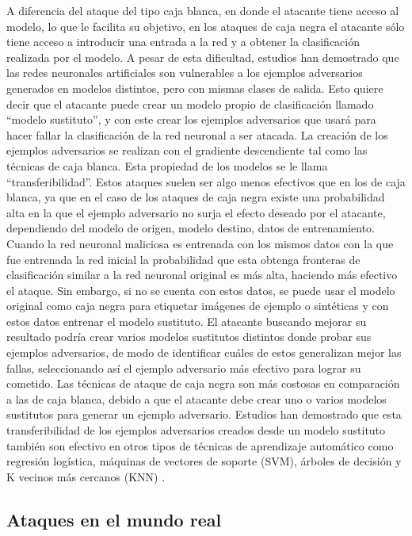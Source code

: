 A diferencia del ataque del tipo caja blanca, en donde el atacante tiene acceso al modelo, lo que le facilita su objetivo, en los ataques de caja negra el atacante sólo tiene acceso a introducir una entrada a la red y a obtener la clasificación realizada por el modelo. A pesar de esta dificultad, estudios \parencite{r4} han demostrado que las redes neuronales artificiales son vulnerables a los ejemplos adversarios generados en modelos distintos, pero con mismas clases de salida. Esto quiere decir que el atacante puede crear un modelo propio de clasificación llamado “modelo sustituto”, y con este crear los ejemplos adversarios que usará para hacer fallar la clasificación de la red neuronal a ser atacada. La creación de los ejemplos adversarios se realizan con el gradiente descendiente tal como las técnicas de caja blanca. Esta propiedad de los modelos se le llama “transferibilidad”. Estos ataques suelen ser algo menos efectivos que en los de caja blanca, ya que en el caso de los ataques de caja negra existe una probabilidad alta en la que el ejemplo adversario no surja el efecto deseado por el atacante, dependiendo del modelo de origen, modelo destino, datos de entrenamiento. Cuando la red neuronal maliciosa es entrenada con los mismos datos con la que fue entrenada la red inicial la probabilidad que esta obtenga fronteras de clasificación similar a la red neuronal original es más alta, haciendo más efectivo el ataque. Sin embargo, si no se cuenta con estos datos, se puede usar el modelo original como caja negra para etiquetar imágenes de ejemplo o sintéticas y con estos datos entrenar el modelo sustituto. El atacante buscando mejorar su resultado podría crear varios modelos sustitutos distintos donde probar sus ejemplos adversarios, de modo de identificar cuáles de estos generalizan mejor las fallas, seleccionando así el ejemplo adversario más efectivo para lograr su cometido. Las técnicas de ataque de caja negra son más costosas en comparación a las de caja blanca, debido a que el atacante debe crear uno o varios modelos sustitutos para generar un ejemplo adversario. 
Estudios han demostrado que esta transferibilidad de los ejemplos adversarios creados desde un modelo sustituto también son efectivo en otros tipos de técnicas de aprendizaje automático como regresión logística, máquinas de vectores de soporte (SVM), árboles de decisión y K vecinos más cercanos (KNN) \parencite{r9}.




\subsection{Ataques en el mundo real}

